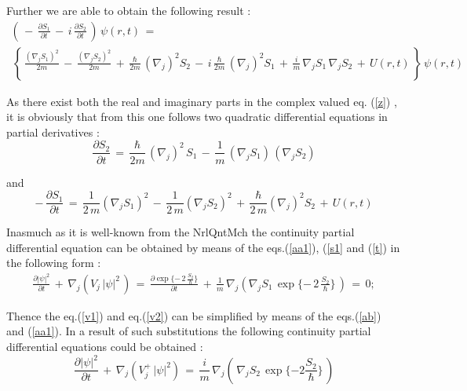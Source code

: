\documentclass[12pt]{article}
\begin{document}
 Further we are able to obtain the following result :
\begin{eqnarray}\label{z}
\left(\,-\,\frac{\partial {S_1}}{\partial t}\,-
\,i\,\frac{\partial {S_2}}{\partial t}\,\right)\,\psi(r,t)\,= \nonumber \\
\,\left\{\,\frac{(\nabla _j {S_1})^2}{2m}\,-
\,\frac{(\nabla_j {S_2})^2}{2m}\,+
\,\frac{\hbar}{2m}\,(\nabla_j)^2 {S_2}\,-
\,i\,\frac{\hbar}{2m}\,(\nabla_j)^2 {S_1}\,+
\,\frac{i}{m}\,\nabla_j {S_1}\,\nabla_j {S_2}\,+
\,U(r,t)\,\right\}\,\psi(r,t)\,
\end{eqnarray}

 As there exist both the real and imaginary parts in the complex valued eq.
(\ref{z}) , it is obviously that from this one follows two quadratic
differential equations in partial derivatives :
\begin{equation}\label{aa1}
\frac{\partial {S_2}}{\partial t}\,=
\,\frac{\hbar}{2m}\,(\nabla _j)^2\,{S_1}\,-
\,\frac{1}{m}\,(\nabla _j {S_1})\,(\nabla _j {S_2})
\end{equation}

and
\begin{equation}\label{aa2}
-\,\frac{\partial {S_1}}{\partial t}\,=
\,\frac{1}{2\,m}(\nabla _j {S_1})^2\,-
\,\frac{1}{2\,m}(\nabla _j {S_2})^2\,+
\,\frac{\hbar}{2\,m}(\nabla _j)^2 {S_2}\,+\,U(r,t)
\end{equation}

  Inasmuch as it is well-known from the NrlQntMch the continuity partial
differential equation can be obtained by means of the eqs.(\ref{aa1}),
(\ref{s1} and (\ref{t}) in the following form :
\begin{eqnarray}\label{ab}
\frac{\partial {\left|\psi\right|^2}}{\partial t}\,+
\,\nabla _j \left(V_j\,{\left|\psi\right|^2}\,\right)\,=
\,\frac{\partial \exp{\{-\,2\,\frac{S_2}{\hbar}\}}}{\partial t}\,+
\,\frac{1}{m}\,\nabla _j \left(\nabla _j {S_1}
\,\exp{\{-\,2\,\frac{S_2}{\hbar}\}}\,\right)\,=\,0 ;
\end{eqnarray}

 Thence the eq.(\ref{v1}) and eq.(\ref{v2}) can be simplified by means of
the eqs.(\ref{ab}) and (\ref{aa1}). In a result of such substitutions the
following continuity partial differential equations could be obtained :
\begin{equation}\label{ac1}
\frac{\partial {\left|\psi\right|^2}}{\partial t}\,+
\,\nabla _j \left(V_j^{+}\,{\left|\psi\right|^2}\right)\,=
\,\frac{i}{m}\,\nabla _j \left(\,\nabla _j {S_2}
\,\exp{\{-2\frac{S_2}{\hbar}\}}\,\right)
\end{equation}
\end{document}
